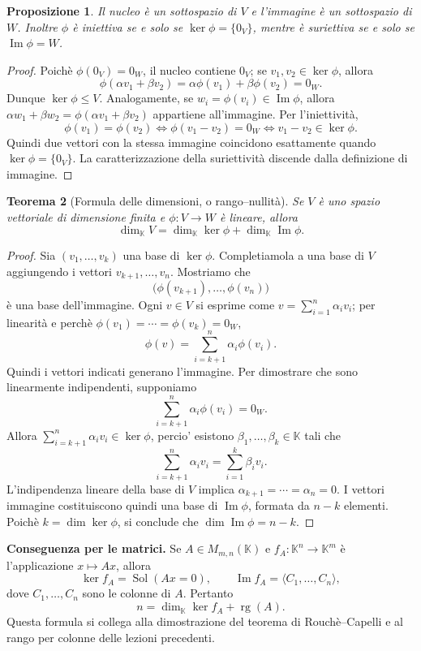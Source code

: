 \documentclass[11pt,a4paper]{article}
\newcommand{\KK}{\mathbb{K}}
\theoremstyle{plain}
\newtheorem{prop}{Proposizione}[section]
\newtheorem{teo}[prop]{Teorema}
\theoremstyle{definition}
\theoremstyle{remark}
\begin{document}
\begin{prop}
Il nucleo è un sottospazio di $V$ e l'immagine è un sottospazio di $W$.
Inoltre $\phi$ è iniettiva se e solo se $\ker\phi=\{0_V\}$,
mentre è suriettiva se e solo se $\operatorname{Im}\phi=W$.
\end{prop}
\begin{proof}
Poichè $\phi(0_V)=0_W$, il nucleo contiene $0_V$; se $v_1,v_2\in\ker\phi$,
allora
\[
 \phi(\alpha v_1+\beta v_2)
 =\alpha\phi(v_1)+\beta\phi(v_2)=0_W.
\]
Dunque $\ker\phi\leq V$. Analogamente, se $w_i=\phi(v_i)\in\operatorname{Im}\phi$,
allora $\alpha w_1+\beta w_2=\phi(\alpha v_1+\beta v_2)$ appartiene
all'immagine. Per l'iniettività,
\[
 \phi(v_1)=\phi(v_2)\iff \phi(v_1-v_2)=0_W
 \iff v_1-v_2\in\ker\phi.
\]
Quindi due vettori con la stessa immagine coincidono esattamente quando
$\ker\phi=\{0_V\}$. La caratterizzazione della suriettività discende
dalla definizione di immagine.
\end{proof}

\begin{teo}[Formula delle dimensioni, o rango--nullità]
Se $V$ è uno spazio vettoriale di dimensione finita e
$\phi:V\to W$ è lineare, allora
\[
 \boxed{\dim_{\KK}V=\dim_{\KK}\ker\phi+
 \dim_{\KK}\operatorname{Im}\phi.}
\]
\end{teo}
\begin{proof}
Sia $(v_1,\ldots,v_k)$ una base di $\ker\phi$.
Completiamola a una base di $V$ aggiungendo i vettori
$v_{k+1},\ldots,v_n$. Mostriamo che
\[
 \bigl(\phi(v_{k+1}),\ldots,\phi(v_n)\bigr)
\]
è una base dell'immagine. Ogni $v\in V$ si esprime come
$v=\sum_{i=1}^{n}\alpha_i v_i$; per linearità e perchè
$\phi(v_1)=\cdots=\phi(v_k)=0_W$,
\[
 \phi(v)=\sum_{i=k+1}^{n}\alpha_i\phi(v_i).
\]
Quindi i vettori indicati generano l'immagine. Per dimostrare che sono
linearmente indipendenti, supponiamo
\[
 \sum_{i=k+1}^{n}\alpha_i\phi(v_i)=0_W.
\]
Allora $\sum_{i=k+1}^{n}\alpha_i v_i\in\ker\phi$, percio' esistono
$\beta_1,\ldots,\beta_k\in\KK$ tali che
\[
 \sum_{i=k+1}^{n}\alpha_i v_i=\sum_{i=1}^{k}\beta_i v_i.
\]
L'indipendenza lineare della base di $V$ implica
$\alpha_{k+1}=\cdots=\alpha_n=0$. I vettori immagine costituiscono
quindi una base di $\operatorname{Im}\phi$, formata da $n-k$ elementi.
Poichè $k=\dim\ker\phi$, si conclude che
$\dim\operatorname{Im}\phi=n-k$.
\end{proof}

\noindent\textbf{Conseguenza per le matrici.} Se $A\in M_{m,n}(\KK)$ e
$f_A:\KK^n\to\KK^m$ è l'applicazione $x\mapsto Ax$, allora
\[
 \ker f_A=\operatorname{Sol}(Ax=0),\qquad
 \operatorname{Im}f_A=\langle C_1,\ldots,C_n\rangle,
\]
dove $C_1,\ldots,C_n$ sono le colonne di $A$. Pertanto
\[
 \boxed{n=\dim_{\KK}\ker f_A+\operatorname{rg}(A).}
\]
Questa formula si collega alla dimostrazione del teorema di
Rouchè--Capelli e al rango per colonne delle lezioni precedenti.
\end{document}
